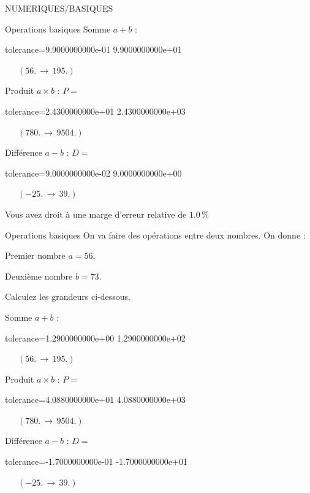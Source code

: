 \documentclass[12pt]{article}
\begin{document}
\begin{quiz}{NUMERIQUES/BASIQUES}
\begin{cloze}{Operations basiques}
Somme $ a + b $ : 
\begin{numerical}[points=1] 
\item[tolerance={9.9000000000e-01}] 9.9000000000e+01 
\end{numerical} 
 $\,$ 
 $ \quad (56. \, \rightarrow \, 195.) $ 

Produit $ a \times b $ : $P =  $
\begin{numerical}[points=1] 
\item[tolerance={2.4300000000e+01}] 2.4300000000e+03 
\end{numerical} 
 $\,$ 
 $ \quad (780. \, \rightarrow \, 9504.) $ 

Différence $ a - b $ : $D =  $
\begin{numerical}[points=1] 
\item[tolerance={9.0000000000e-02}] 9.0000000000e+00 
\end{numerical} 
 $\,$ 
 $ \quad (-25. \, \rightarrow \, 39.) $ 

Vous avez droit à une marge d'erreur relative de $1.0\, \% $

\end{cloze} 


 \begin{cloze}{Operations basiques} 
On va faire des opérations entre deux nombres. On donne :

Premier nombre $a = 56.\, $

Deuxième nombre $b = 73.\, $

 

Calculez les grandeurs ci-dessous.

Somme $ a + b $ : 
\begin{numerical}[points=1] 
\item[tolerance={1.2900000000e+00}] 1.2900000000e+02 
\end{numerical} 
 $\,$ 
 $ \quad (56. \, \rightarrow \, 195.) $ 

Produit $ a \times b $ : $P =  $
\begin{numerical}[points=1] 
\item[tolerance={4.0880000000e+01}] 4.0880000000e+03 
\end{numerical} 
 $\,$ 
 $ \quad (780. \, \rightarrow \, 9504.) $ 

Différence $ a - b $ : $D =  $
\begin{numerical}[points=1] 
\item[tolerance={-1.7000000000e-01}] -1.7000000000e+01 
\end{numerical} 
 $\,$ 
 $ \quad (-25. \, \rightarrow \, 39.) $ 


\end{cloze}
\end{quiz}
\end{document}
